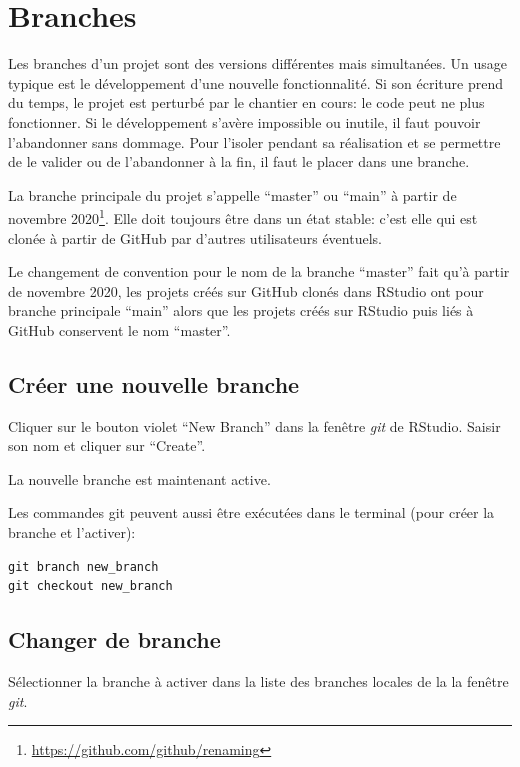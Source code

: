 \documentclass[
  12pt,
  french,
  a4paper,
  extrafontsizes,onecolumn,openright
  ]{memoir}
\begin{document}
\section{Branches}\label{sec:branches}

Les branches d'un projet sont des versions différentes mais simultanées.
Un usage typique est le développement d'une nouvelle fonctionnalité.
Si son écriture prend du temps, le projet est perturbé par le chantier en cours: le code peut ne plus fonctionner.
Si le développement s'avère impossible ou inutile, il faut pouvoir l'abandonner sans dommage.
Pour l'isoler pendant sa réalisation et se permettre de le valider ou de l'abandonner à la fin, il faut le placer dans une branche.

La branche principale du projet s'appelle \enquote{master} ou \enquote{main} à partir de novembre 2020\footnote{\url{https://github.com/github/renaming}}.
Elle doit toujours être dans un état stable: c'est elle qui est clonée à partir de GitHub par d'autres utilisateurs éventuels.

Le changement de convention pour le nom de la branche \enquote{master} fait qu'à partir de novembre 2020, les projets créés sur GitHub clonés dans RStudio ont pour branche principale \enquote{main} alors que les projets créés sur RStudio puis liés à GitHub conservent le nom \enquote{master}.

\subsection{Créer une nouvelle branche}\label{cruxe9er-une-nouvelle-branche}

Cliquer sur le bouton violet \enquote{New Branch} dans la fenêtre \emph{git} de RStudio.
Saisir son nom et cliquer sur \enquote{Create}.

La nouvelle branche est maintenant active.

Les commandes git peuvent aussi être exécutées dans le terminal (pour créer la branche et l'activer):

\begin{verbatim}
git branch new_branch
git checkout new_branch
\end{verbatim}

\subsection{Changer de branche}\label{changer-de-branche}

Sélectionner la branche à activer dans la liste des branches locales de la la fenêtre \emph{git}.
\end{document}
